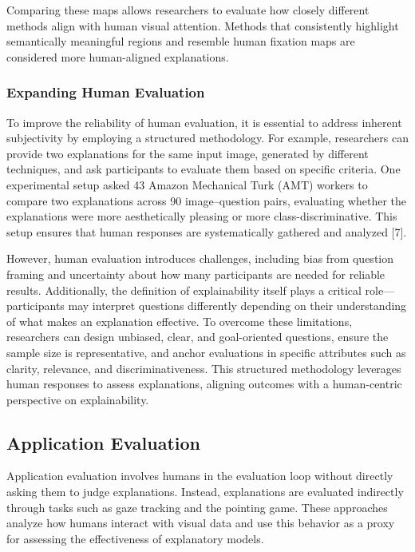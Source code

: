 \documentclass{article}
\renewcommand{\cite}[1]{[#1]}
\begin{document}
Comparing these maps allows researchers to evaluate how closely different
methods align with human visual attention. Methods that consistently highlight
semantically meaningful regions and resemble human fixation maps are considered
more human-aligned explanations.

\subsubsection{Expanding Human Evaluation}

To improve the reliability of human evaluation, it is essential to address inherent subjectivity by employing a structured methodology. For example, researchers can provide two explanations for the same input image, generated by different techniques, and ask participants to evaluate them based on specific criteria. One experimental setup asked 43 Amazon Mechanical Turk (AMT) workers to compare two explanations across 90 image–question pairs, evaluating whether the explanations were more aesthetically pleasing or more class-discriminative. This setup ensures that human responses are systematically gathered and analyzed \cite{7}.

However, human evaluation introduces challenges, including bias from question framing and uncertainty about how many participants are needed for reliable results. Additionally, the definition of explainability itself plays a critical role—participants may interpret questions differently depending on their understanding of what makes an explanation effective. To overcome these limitations, researchers can design unbiased, clear, and goal-oriented questions, ensure the sample size is representative, and anchor evaluations in specific attributes such as clarity, relevance, and discriminativeness. This structured methodology leverages human responses to assess explanations, aligning outcomes with a human-centric perspective on explainability.

\subsection{Application Evaluation}

Application evaluation involves humans in the evaluation loop without 
directly asking them to judge explanations. Instead, explanations are 
evaluated indirectly through tasks such as gaze tracking and the 
pointing game. These approaches analyze how humans interact with visual 
data and use this behavior as a proxy for assessing the effectiveness of 
explanatory models.
\end{document}
